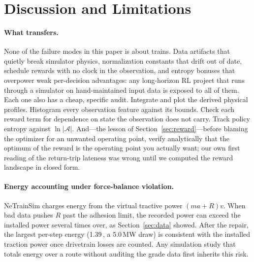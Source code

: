\documentclass[11pt,a4paper]{article}
\newcommand{\kwh}{\,\text{kWh}}   %
\begin{document}
\section{Discussion and Limitations}
\label{sec:discussion}

\paragraph{What transfers.} None of the failure modes in this paper is
about trains. Data artifacts that quietly break simulator physics,
normalization constants that drift out of date, schedule rewards with no
clock in the observation, and entropy bonuses that overpower weak
per-decision advantages: any long-horizon RL project that runs through a
simulator on hand-maintained input data is exposed to all of them. Each one
also has a cheap, specific audit. Integrate and plot the derived physical
profiles. Histogram every observation feature against its bounds. Check each
reward term for dependence on state the observation does not carry. Track
policy entropy against $\ln |\mathcal{A}|$. And---the lesson of
Section~\ref{sec:reward}---before blaming the optimizer for an unwanted
operating point, verify analytically that the optimum of the reward is the
operating point you actually want; our own first reading of the return-trip
lateness was wrong until we computed the reward landscape in closed form.

\paragraph{Energy accounting under force-balance violation.} NeTrainSim
charges energy from the virtual tractive power $(ma + R)v$. When bad data
pushes $R$ past the adhesion limit, the recorded power can exceed the
installed power several times over, as Section~\ref{sec:data} showed.
After the repair, the largest per-step energy (1.39\kwh, a 5.0\,MW draw)
is consistent with the installed traction power once drivetrain losses
are counted. Any simulation study that totals energy over a route without
auditing the grade data first inherits this risk.
\end{document}
